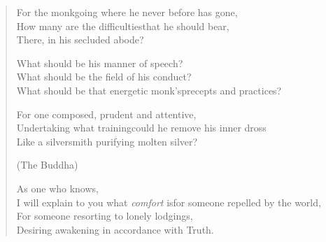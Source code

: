 \begin{verse}


 For the monk\newline going where he never before has gone,\\
How many are the difficulties\newline that he should bear,\\
There, in his secluded abode?


 What should be his manner of speech?\\
What should be the field of his conduct?\\
What should be that energetic monk's\newline precepts and practices?


 For one composed, prudent and attentive,\\
Undertaking what training\newline could he remove his inner dross\\
Like a silversmith purifying molten silver?


(The Buddha)

 As one who knows,\\
I will explain to you what \emph{comfort} is\newline for someone repelled by the world,\\
For someone resorting to lonely lodgings,\\
Desiring awakening in accordance with Truth.


\end{verse}
